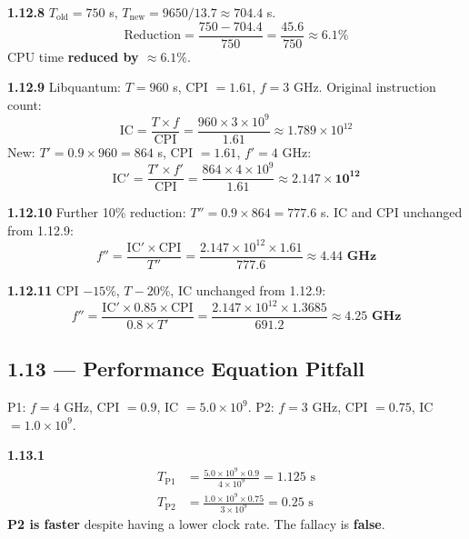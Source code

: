 \medskip\noindent\textbf{1.12.8}
$T_{\text{old}} = 750$ s, \;$T_{\text{new}} = 9650/13.7 \approx 704.4$ s.
\[
  \text{Reduction} = \frac{750 - 704.4}{750}
  = \frac{45.6}{750} \approx 6.1\%
\]
CPU time \textbf{reduced by $\approx 6.1\%$}.

\medskip\noindent\textbf{1.12.9}
Libquantum: $T = 960$ s, CPI $= 1.61$, $f = 3$ GHz.
Original instruction count:
\[
  \text{IC} = \frac{T \times f}{\text{CPI}}
  = \frac{960 \times 3 \times 10^9}{1.61}
  \approx 1.789 \times 10^{12}
\]
New: $T' = 0.9 \times 960 = 864$ s, CPI $= 1.61$, $f' = 4$ GHz:
\[
  \text{IC}' = \frac{T' \times f'}{\text{CPI}}
  = \frac{864 \times 4 \times 10^9}{1.61}
  \approx \mathbf{2.147 \times 10^{12}}
\]

\medskip\noindent\textbf{1.12.10}
Further 10\% reduction: $T'' = 0.9 \times 864 = 777.6$ s.
IC and CPI unchanged from 1.12.9:
\[
  f'' = \frac{\text{IC}' \times \text{CPI}}{T''}
  = \frac{2.147 \times 10^{12} \times 1.61}{777.6}
  \approx \mathbf{4.44\text{ GHz}}
\]

\medskip\noindent\textbf{1.12.11}
CPI $-15\%$, $T -20\%$, IC unchanged from 1.12.9:
\[
  f'' = \frac{\text{IC}' \times 0.85 \times \text{CPI}}{0.8 \times T'}
  = \frac{2.147 \times 10^{12} \times 1.3685}{691.2}
  \approx \mathbf{4.25\text{ GHz}}
\]

\subsection*{1.13 --- Performance Equation Pitfall}
\hypertarget{sol-1.13}{}

P1: $f = 4$ GHz, CPI $= 0.9$, IC $= 5.0 \times 10^9$. \quad
P2: $f = 3$ GHz, CPI $= 0.75$, IC $= 1.0 \times 10^9$.

\medskip\noindent\textbf{1.13.1}
\begin{align*}
  T_{\text{P1}} &= \frac{5.0 \times 10^9 \times 0.9}{4 \times 10^9}
                 = 1.125\text{ s} \\
  T_{\text{P2}} &= \frac{1.0 \times 10^9 \times 0.75}{3 \times 10^9}
                 = 0.25\text{ s}
\end{align*}
\textbf{P2 is faster} despite having a lower clock rate.  The fallacy is
\textbf{false}.

